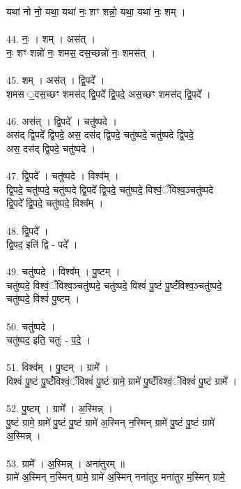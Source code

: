 यथा॑ नो नो॒ यथा॒ यथा॑ नः॒ शꣳ शन्नो॒ यथा॒ यथा॑ नः॒ शम् ।\\
\\
44. नः॒ । शम् । अस॑त् ।\\
नः॒ शꣳ शन्नो॑ नः॒ शमस॒ दस॒च्छन्नो॑ नः॒ शमस॑त् ।\\
\\
45. शम् । अस॑त् । द्वि॒पदे᳚ ।\\
शमस ॒दस॒च्छꣳ शमस॑द् द्वि॒पदे᳚ द्वि॒पदे॒ अस॒च्छꣳ शमस॑द् द्वि॒पदे᳚ ।\\
\\
46. अस॑त् । द्वि॒पदे᳚ । चतु॑ष्पदे ।\\
अस॑द् द्वि॒पदे᳚ द्वि॒पदे॒ अस॒ दस॑द् द्वि॒पदे॒ चतु॑ष्पदे॒ चतु॑ष्पदे द्वि॒पदे॒\\
अस॒ दस॑द् द्वि॒पदे॒ चतु॑ष्पदे ।\\
\\
47. द्वि॒पदे᳚ । चतु॑ष्पदे । विश्व᳚म् ।\\
द्वि॒पदे॒ चतु॑ष्पदे॒ चतु॑ष्पदे द्वि॒पदे᳚ द्वि॒पदे॒ चतु॑ष्पदे॒ विश्वं॒ँविश्व॒ञ्चतु॑ष्पदे\\
द्वि॒पदे᳚ द्वि॒पदे॒ चतु॑ष्पदे॒ विश्व᳚म् ।\\
\\
48. द्वि॒पदे᳚ ।\\
द्वि॒पद॒ इति॑ द्वि - पदे᳚ ।\\
\\
49. चतु॑ष्पदे । विश्व᳚म् । पु॒ष्टम् ।\\
चतु॑ष्पदे॒ विश्वं॒ँविश्व॒ञ्चतु॑ष्पदे॒ चतु॑ष्पदे॒ विश्वं॑ पु॒ष्टं पु॒ष्टंँविश्व॒ञ्चतु॑ष्पदे॒\\
चतु॑ष्पदे॒ विश्वं॑ पु॒ष्टम् ।\\
\\
50. चतु॑ष्पदे ।\\
चतु॑ष्पद॒ इति॒ चतुः॑ - प॒दे॒ ।\\
\\
51. विश्व᳚म् । पु॒ष्टम् । ग्रामे᳚ ।\\
विश्वं॑ पु॒ष्टं पु॒ष्टंँविश्वं॒ँविश्वं॑ पु॒ष्टं ग्रामे॒ ग्रामे॑ पु॒ष्टंँविश्वं॒ँविश्वं॑ पु॒ष्टं ग्रामे᳚ ।\\
\\
52. पु॒ष्टम् । ग्रामे᳚ । अ॒स्मिन्न् ।\\
पु॒ष्टं ग्रामे॒ ग्रामे॑ पु॒ष्टं पु॒ष्टं ग्रामे॑ अ॒स्मिन् न॒स्मिन् ग्रामे॑ पु॒ष्टं पु॒ष्टं ग्रामे॑\\
अ॒स्मिन्न् ।\\
\\
53. ग्रामे᳚ । अ॒स्मिन्न् । अना॑तुरम् ॥\\
ग्रामे॑ अ॒स्मिन् न॒स्मिन् ग्रामे॒ ग्रामे॑ अ॒स्मिन् नना॑तुर॒ मना॑तुर म॒स्मिन् ग्रामे॒\\

